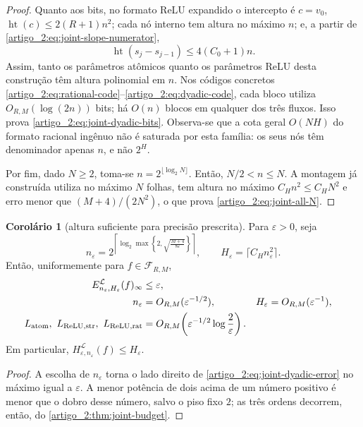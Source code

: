 \documentclass[12pt,a4paper]{article}
\theoremstyle{preciso}
\theoremstyle{definition}
\newcommand{\Library}{\mathcal{L}}
\newcommand{\height}{\operatorname{ht}}
\theoremstyle{preciso}
\theoremstyle{preciso}
\theoremstyle{preciso}
\theoremstyle{preciso}
\newtheorem{corollary}[teorema]{Corolário}
\theoremstyle{definition}
\theoremstyle{preciso}
\theoremstyle{definition}
\theoremstyle{preciso}
\theoremstyle{preciso}
\theoremstyle{definition}
\begin{document}
\begin{proof}
Quanto aos bits, no formato ReLU expandido o intercepto é $c=v_0$,
$\height(c)\le2(R+1)n^2$; cada nó interno tem altura no máximo $n$; e, a partir de
\eqref{artigo_2:eq:joint-slope-numerator},
\[
 \height(s_j-s_{j-1})\le4(C_0+1)n.
\]
Assim, tanto os parâmetros atômicos quanto os parâmetros ReLU desta
construção têm altura polinomial em $n$. Nos códigos concretos
\eqref{artigo_2:eq:rational-code}--\eqref{artigo_2:eq:dyadic-code}, cada bloco utiliza
$O_{R,M}(\log(2n))$ bits; há $O(n)$ blocos em qualquer dos três fluxos. Isso
prova \eqref{artigo_2:eq:joint-dyadic-bits}. Observa-se que a cota geral
$O(NH)$ do formato racional ingênuo não é saturada por esta família: os seus
nós têm denominador apenas $n$, e não $2^H$.

Por fim, dado $N\ge2$, toma-se $n=2^{\lfloor\log_2N\rfloor}$. Então,
$N/2<n\le N$. A montagem já construída utiliza no máximo $N$ folhas, tem altura
no máximo $C_Hn^2\le C_HN^2$ e erro menor que
$(M+4)/(2N^2)$, o que prova \eqref{artigo_2:eq:joint-all-N}.
\end{proof}

\begin{corollary}[altura suficiente para precisão prescrita]\label{map:artigo_2:3.17}
\label{artigo_2:cor:height-for-epsilon}
Para $\varepsilon>0$, seja
\begin{equation}
 n_\varepsilon
 =2^{\left\lceil\log_2\max\left\{2,
        \sqrt{\frac{M+4}{8\varepsilon}}\right\}\right\rceil},
 \qquad
 H_\varepsilon=\lceil C_Hn_\varepsilon^2\rceil.
 \label{artigo_2:eq:epsilon-schedule}
\end{equation}
Então, uniformemente para $f\in\mathcal F_{R,M}$,
\begin{align}
 E_{n_\varepsilon,H_\varepsilon}^{\Library}(f)_\infty
 &\le\varepsilon,\label{artigo_2:eq:epsilon-joint-error}\\
 n_\varepsilon&=O_{R,M}(\varepsilon^{-1/2}),
 &H_\varepsilon&=O_{R,M}(\varepsilon^{-1}),
 \label{artigo_2:eq:epsilon-joint-height}\\
 L_{\rm atom},\ L_{\rm ReLU,str},\ L_{\rm ReLU,rat}
 &=O_{R,M}\!\left(\varepsilon^{-1/2}
                   \log\frac{2}{\varepsilon}\right).
 \label{artigo_2:eq:epsilon-joint-bits}
\end{align}
Em particular,
$H_{\varepsilon,n_\varepsilon}^{\Library}(f)\le H_\varepsilon$.
\end{corollary}

\begin{proof}
A escolha de $n_\varepsilon$ torna o lado direito de
\eqref{artigo_2:eq:joint-dyadic-error} no máximo igual a $\varepsilon$. A menor potência de
dois acima de um número positivo é menor que o dobro desse número, salvo o
piso fixo $2$; as três ordens decorrem, então, do \cref{artigo_2:thm:joint-budget}.
\end{proof}
\end{document}
